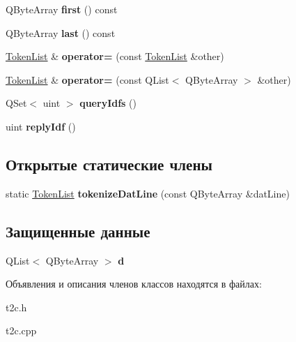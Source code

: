 \begin{DoxyCompactItemize}
\item 
\hypertarget{class_token_list_a8b0583c01111904a72ea2b4126955f0a}{Q\-Byte\-Array {\bfseries first} () const }\label{class_token_list_a8b0583c01111904a72ea2b4126955f0a}

\item 
\hypertarget{class_token_list_ab300c654af3b3f5b06d24935e0754323}{Q\-Byte\-Array {\bfseries last} () const }\label{class_token_list_ab300c654af3b3f5b06d24935e0754323}

\item 
\hypertarget{class_token_list_aed8ecd9af9536bde2708c8ea05c1a52a}{\hyperlink{class_token_list}{Token\-List} \& {\bfseries operator=} (const \hyperlink{class_token_list}{Token\-List} \&other)}\label{class_token_list_aed8ecd9af9536bde2708c8ea05c1a52a}

\item 
\hypertarget{class_token_list_a0e413a5c70d3f19ad300b0ee484e1749}{\hyperlink{class_token_list}{Token\-List} \& {\bfseries operator=} (const Q\-List$<$ Q\-Byte\-Array $>$ \&other)}\label{class_token_list_a0e413a5c70d3f19ad300b0ee484e1749}

\item 
\hypertarget{class_token_list_a056c04674b1c97e6c16d4b09bfcbb78c}{Q\-Set$<$ uint $>$ {\bfseries query\-Idfs} ()}\label{class_token_list_a056c04674b1c97e6c16d4b09bfcbb78c}

\item 
\hypertarget{class_token_list_a31f9bb3c971e58a87c97d7cc2428a4ee}{uint {\bfseries reply\-Idf} ()}\label{class_token_list_a31f9bb3c971e58a87c97d7cc2428a4ee}

\end{DoxyCompactItemize}
\subsection*{Открытые статические члены}
\begin{DoxyCompactItemize}
\item 
\hypertarget{class_token_list_a2b2d1df73a74d1443ec361d6990c0881}{static \hyperlink{class_token_list}{Token\-List} {\bfseries tokenize\-Dat\-Line} (const Q\-Byte\-Array \&dat\-Line)}\label{class_token_list_a2b2d1df73a74d1443ec361d6990c0881}

\end{DoxyCompactItemize}
\subsection*{Защищенные данные}
\begin{DoxyCompactItemize}
\item 
\hypertarget{class_token_list_acac37f11228b5c01458338318c203cbf}{Q\-List$<$ Q\-Byte\-Array $>$ {\bfseries d}}\label{class_token_list_acac37f11228b5c01458338318c203cbf}

\end{DoxyCompactItemize}


Объявления и описания членов классов находятся в файлах\-:\begin{DoxyCompactItemize}
\item 
t2c.\-h\item 
t2c.\-cpp\end{DoxyCompactItemize}

